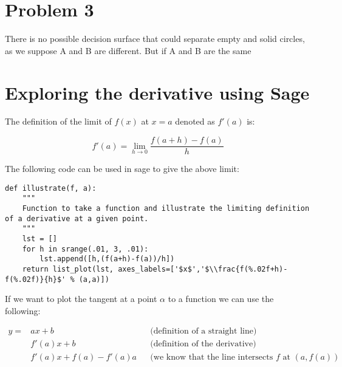 \documentclass[a4paper]{article}
\begin{document}
\section{Problem 3}

There is no possible decision surface that could separate empty and solid circles, as we suppose A and B are different. 
But if A and B are the same 














\section{Exploring the derivative using Sage}

The definition of the limit of $f(x)$ at $x=a$ denoted as $f'(a)$ is:

\begin{equation}
f'(a) = \lim_{h\to0}\frac{f(a+h)-f(a)}{h}
\end{equation}

The following code can be used in sage to give the above limit:

\begin{verbatim}
def illustrate(f, a):
    """
    Function to take a function and illustrate the limiting definition of a derivative at a given point.
    """
    lst = []
    for h in srange(.01, 3, .01):
    	lst.append([h,(f(a+h)-f(a))/h])
    return list_plot(lst, axes_labels=['$x$','$\\frac{f(%.02f+h)-f(%.02f)}{h}$' % (a,a)])
\end{verbatim}



If we want to plot the tangent at a point $\alpha$ to a function we can use the following:

\begin{align}
y=&ax+b&&\text{(definition of a straight line)}\nonumber\\
  &f'(a)x+b&&\text{(definition of the derivative)}\nonumber\\
  &f'(a)x+f(a)-f'(a)a&&\text{(we know that the line intersects $f$ at $(a,f(a))$}\nonumber
\end{align}
\end{document}
